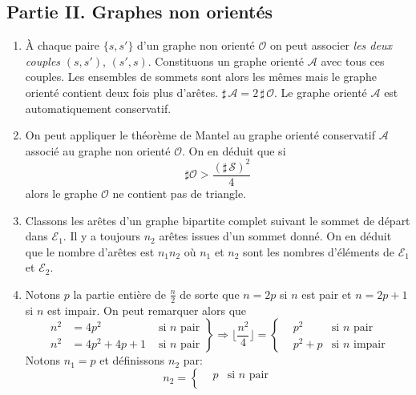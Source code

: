\subsection*{Partie II. Graphes non orientés}
\begin{enumerate}
 \item \`A chaque paire $\{s,s'\}$ d'un graphe non orienté $\mathcal O$ on peut associer \emph{les deux couples} $(s,s')$, $(s',s)$. Constituons un graphe orienté $\mathcal A$ avec tous ces couples. Les ensembles de sommets sont alors les mêmes mais le graphe orienté contient deux fois plus d'arêtes. $\sharp\,\mathcal A = 2\,\sharp\, \mathcal O$. Le graphe orienté $\mathcal A$ est automatiquement conservatif. 
 \item On peut appliquer le théorème de Mantel au graphe orienté conservatif $\mathcal A$ associé au graphe non orienté $\mathcal O$. On en déduit que si
\begin{displaymath}
 \sharp \mathcal O >\frac{(\sharp\, \mathcal S)^2}{4}
\end{displaymath}
alors le graphe $\mathcal{O}$ ne contient pas de triangle.
 \item Classons les arêtes d'un graphe bipartite complet suivant le sommet de départ dans $\mathcal E_1$. Il y a toujours $n_2$ arêtes issues d'un sommet donné. On en déduit que le nombre d'arêtes est $n_1n_2$ où $n_1$ et $n_2$ sont les nombres d'éléments de $\mathcal E_1$ et $\mathcal E_2$.
 \item Notons $p$ la partie entière de $\frac{n}{2}$ de sorte que $n=2p$ si $n$ est pair et $n=2p+1$ si $n$ est impair.\newline
On peut remarquer alors que 
\begin{displaymath}
 \left. 
\begin{aligned}
 n^2 &= 4p^2     &\text{ si $n$ pair} \\
 n^2 &= 4p^2 +4p +1 &\text{ si $n$ pair} 
\end{aligned}
\right\rbrace 
\Rightarrow
\lfloor\frac{n^2}{4}\rfloor = 
\left\lbrace 
\begin{aligned}
&p^2 &\text{si $n$ pair}\\ 
&p^2 +p &\text{si $n$ impair}
\end{aligned}
\right. 
\end{displaymath}
Notons $n_1=p$ et définissons $n_2$ par:
\begin{displaymath}
 n_2 = 
\left\lbrace 
\begin{aligned}
&p &\text{si $n$ pair}\\ 

\end{aligned}
\end{displaymath}
\end{enumerate}
